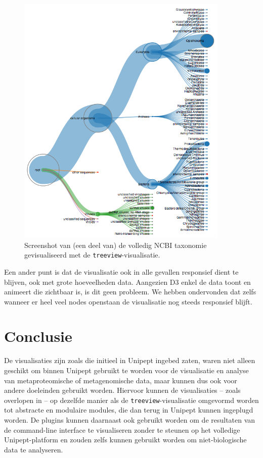 \begin{figure}
\centering
\includegraphics[width=0.9\textwidth]{includes/fulltaxy}
\caption{Screenshot van (een deel van) de volledig NCBI taxonomie 
gevisualiseerd met de \texttt{treeview}-visualisatie.}
\label{fig:fulltaxy}
\end{figure}

Een ander punt is dat de visualisatie ook in alle gevallen responsief dient te 
blijven, ook met grote hoeveelheden data. Aangezien D3 enkel de data toont 
en animeert die zichtbaar is, is dit geen probleem. We hebben ondervonden dat 
zelfs wanneer er heel veel nodes openstaan de 
visualisatie nog steeds responsief blijft.

\section{Conclusie}
De visualisaties zijn zoals die initieel in Unipept ingebed zaten, waren niet 
alleen geschikt om binnen Unipept gebruikt te worden voor de visualisatie en 
analyse van metaproteomische
of metagenomische data, maar kunnen dus ook voor andere doeleinden gebruikt 
worden. Hiervoor kunnen de visualisaties -- zoals overlopen in
 -- op dezelfde manier als de
\texttt{treeview}-visualisatie omgevormd worden tot abstracte en modulaire
modules, die dan terug in Unipept kunnen ingeplugd worden. De plugins kunnen
daarnaast ook gebruikt worden om de resultaten van de command-line interface te
visualiseren zonder te steunen op het volledige Unipept-platform en zouden zelfs
kunnen gebruikt worden om niet-biologische data te analyseren.


